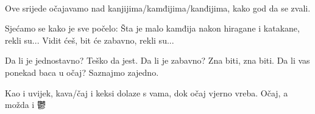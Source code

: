 \documentclass[ocha-dark]{grampig}
\begin{document}
	\onehalfspacing
	\obeylines
	{\Large {}} \\[-0.5em]
	
	Ove srijede očajavamo nad kanjijima/kamđijima/kanđijima, kako god da se zvali. \\[-1em]
	
	\begin{center}
		Sjećamo se kako je sve počelo:
		Šta je malo kamđija nakon hiragane i katakane, rekli su...
		Vidit ćeš, bit će zabavno, rekli su...
	\end{center}\vspace{0.5em}
	
	\begin{center}
		Da li je jednostavno? Teško da jest. 
		Da li je zabavno? Zna biti, zna biti. 
		Da li vas ponekad baca u očaj? Saznajmo zajedno. 
	\end{center}\vspace{0.5em}
	
	Kao i uvijek, kava/čaj i keksi dolaze s vama, dok očaj vjerno vreba. Očaj, a možda i 鬱 \\[-1em]
	
	\begin{center}
	\end{center}
\end{document}
